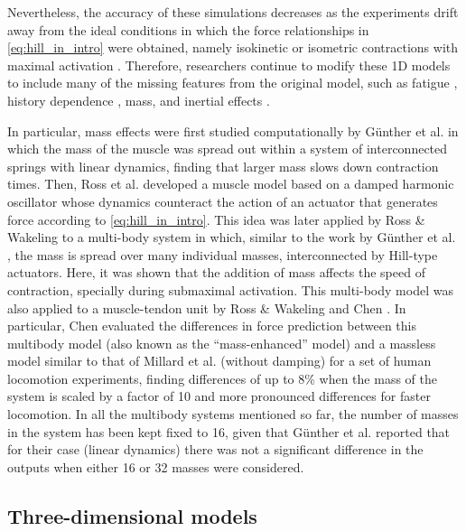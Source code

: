 \documentclass{sfuthesis}
\numberwithin{equation}{section}
\numberwithin{figure}{chapter}
\numberwithin{table}{chapter}
\theoremstyle{definition}
\begin{document}
Nevertheless, the accuracy of these simulations decreases as the experiments drift away from the ideal conditions in which the force relationships in \eqref{eq:hill_in_intro} were obtained, namely isokinetic or isometric contractions with maximal activation \cite{Dick2017, Lee2013AccuracyofGastrocForces, MillardEtAl2013, Perreault2003HillErrors}.  Therefore, researchers continue to modify these 1D models to include many of the missing features from the original model, such as fatigue \cite{Pereira2011Fatigue1D}, history dependence \cite{McGowanEtAl2013,Ross2018}, mass, and inertial effects \cite{Gunther2012,Ross2018,RossWakeling2016Multibody,Paper4_RossWakeling2021}.

In particular, mass effects were first studied computationally by G\"{u}nther et al. \cite{Gunther2012} in which the mass of the muscle was spread out within a system of interconnected springs with linear dynamics, finding that larger mass slows down contraction times. Then, Ross et al. \cite{Ross2018} developed a muscle model based on a damped harmonic oscillator whose dynamics counteract the action of an actuator that generates force according to \eqref{eq:hill_in_intro}. This idea was later applied by Ross \& Wakeling \cite{RossWakeling2016Multibody} to a multi-body system in which, similar to the work by G\"{u}nther et al. \cite{Gunther2012}, the mass is spread over many individual masses, interconnected by Hill-type actuators. Here, it was shown that the addition of mass affects the speed of contraction, specially during submaximal activation. This multi-body model was also applied to a muscle-tendon unit by Ross \& Wakeling \cite{Paper4_RossWakeling2021} and Chen \cite{EvanThesis}. In particular, Chen evaluated the differences in force prediction between this multibody model (also known as the ``mass-enhanced'' model) and a massless model similar to that of  Millard et al. \cite{MillardEtAl2013} (without damping) for a set of human locomotion experiments, finding differences of up to 8\% when the mass of the system is scaled by a factor of 10 and more pronounced differences for faster locomotion. In all the multibody systems mentioned so far, the number of masses in the system has been kept fixed to 16, given that G\"{u}nther et al. \cite{Gunther2012} reported that for their case (linear dynamics) there was not a significant difference in the outputs when either 16 or 32 masses were considered. 

\subsection{Three-dimensional models}
\end{document}
